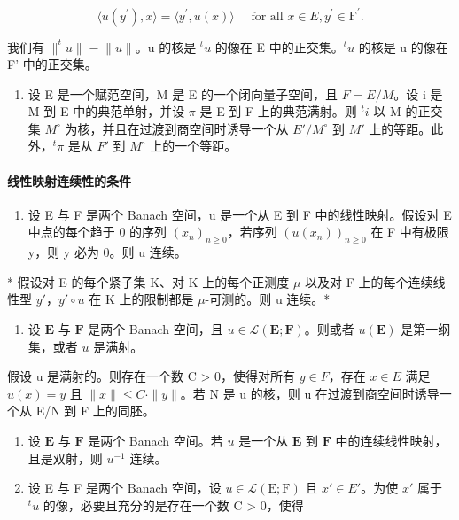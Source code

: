 \[
\langle u (y ^ {\prime}), x \rangle = \langle y ^ {\prime}, u (x) \rangle \quad \text {   for   all   } x \in E, y ^ {\prime} \in \mathrm{F} ^ {\prime}.\tag{6}
\]

我们有 \(\|^{t}u\| = \|u\|\)。u 的核是 \(^{t}u\) 的像在 E 中的正交集。\(^{t}u\) 的核是 u 的像在 F' 中的正交集。

\begin{enumerate}
\def\labelenumi{\arabic{enumi})}
\setcounter{enumi}{9}
\tightlist
\item
  设 E 是一个赋范空间，M 是 E 的一个闭向量子空间，且 \(F = E/M\)。设 i 是 M 到 E 中的典范单射，并设 \(\pi\) 是 E 到 F 上的典范满射。则 \(^{t}i\) 以 M 的正交集 \(M^{\circ}\) 为核，并且在过渡到商空间时诱导一个从 \(E'/M^{\circ}\) 到 \(M'\) 上的等距。此外，\(^{t}\pi\) 是从 \(F'\) 到 \(M^{\circ}\) 上的一个等距。
\end{enumerate}

\paragraph{线性映射连续性的条件}

\begin{enumerate}
\def\labelenumi{\arabic{enumi})}
\setcounter{enumi}{10}
\tightlist
\item
  设 E 与 F 是两个 Banach 空间，u 是一个从 E 到 F 中的线性映射。假设对 E 中点的每个趋于 0 的序列 \((x_{n})_{n\geqslant0}\)，若序列 \((u(x_{n}))_{n\geqslant0}\) 在 F 中有极限 y，则 y 必为 0。则 u 连续。
\end{enumerate}

* 假设对 E 的每个紧子集 K、对 K 上的每个正测度 \(\mu\) 以及对 F 上的每个连续线性型 \(y'\)，\(y' \circ u\) 在 K 上的限制都是 \(\mu\)-可测的。则 u 连续。*

\begin{enumerate}
\def\labelenumi{\arabic{enumi})}
\setcounter{enumi}{11}
\tightlist
\item
  设 \(\mathbf{E}\) 与 \(\mathbf{F}\) 是两个 Banach 空间，且 \(u \in \mathcal{L}(\mathbf{E};\mathbf{F})\)。则或者 \(u(\mathbf{E})\) 是第一纲集，或者 \(u\) 是满射。
\end{enumerate}

假设 u 是满射的。则存在一个数 C \textgreater{} 0，使得对所有 \(y \in F\)，存在 \(x \in E\) 满足 \(u(x) = y\) 且 \(\|x\| \leqslant C \cdot \|y\|\)。若 N 是 u 的核，则 u 在过渡到商空间时诱导一个从 E/N 到 F 上的同胚。

\begin{enumerate}
\def\labelenumi{\arabic{enumi})}
\setcounter{enumi}{12}
\item
  设 \(\mathbf{E}\) 与 \(\mathbf{F}\) 是两个 Banach 空间。若 \(u\) 是一个从 \(\mathbf{E}\) 到 \(\mathbf{F}\) 中的连续线性映射，且是双射，则 \(u^{-1}\) 连续。
\item
  设 E 与 F 是两个 Banach 空间，设 \(u \in \mathcal{L}(\mathrm{E}; \mathrm{F})\) 且 \(x' \in E'\)。为使 \(x'\) 属于 \(^{t}u\) 的像，必要且充分的是存在一个数 C \textgreater{} 0，使得
\end{enumerate}

